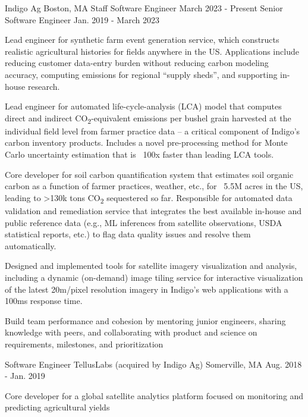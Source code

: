 \documentclass[11pt, a4paper]{awesome-cv}
\begin{document}
\begin{cventries}

  \cventrydouble
    {Indigo Ag}  %
    {Boston, MA}  %
    {Staff Software Engineer}  %
    {March 2023 - Present}  %
    {Senior Software Engineer}  %
    {Jan. 2019 - March 2023}  %
    {
    \begin{cvitems}
      \item Lead engineer for synthetic farm event generation service, which constructs realistic agricultural histories for fields anywhere in the US. Applications include reducing customer data-entry burden without reducing carbon modeling accuracy, computing emissions for regional “supply sheds”, and supporting in-house research.
      \item Lead engineer for automated life-cycle-analysis (LCA) model that computes direct and indirect CO\textsubscript{2}-equivalent emissions per bushel grain harvested at the individual field level from farmer practice data – a critical component of Indigo’s carbon inventory products. Includes a novel pre-processing method for Monte Carlo uncertainty estimation that is ~100x faster than leading LCA tools.
      \item Core developer for soil carbon quantification system that estimates soil organic carbon as a function of farmer practices, weather, etc., for ~5.5M acres in the US, leading to >130k tons CO\textsubscript{2} sequestered so far. Responsible for automated data validation and remediation service that integrates the best available in-house and public reference data (e.g., ML inferences from satellite observations, USDA statistical reports, etc.) to flag data quality issues and resolve them automatically. 
      \item Designed and implemented tools for satellite imagery visualization and analysis, including a dynamic (on-demand) image tiling service for interactive visualization of the latest 20m/pixel resolution imagery in Indigo’s web applications with a 100ms response time.
      \item Build team performance and cohesion by mentoring junior engineers, sharing knowledge with peers, and collaborating with product and science on requirements, milestones, and prioritization
    \end{cvitems}
    }

  \cventrytight
    {Software Engineer}
    {TellusLabs (acquired by Indigo Ag)}
    {Somerville, MA}
    {Aug. 2018 - Jan. 2019}
    {
    \begin{cvitems}
      \item Core developer for a global satellite analytics platform focused on monitoring and predicting agricultural yields
    \end{cvitems}
    }


\end{cventries}
\end{document}
